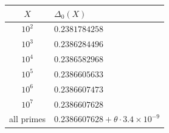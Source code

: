 \begin{tabular}{@{}cl@{}}
\toprule
$X$ & $\Delta_{0}(X)$\\
\midrule
$10^{2}$ & $0.2381784258$\\
$10^{3}$ & $0.2386284496$\\
$10^{4}$ & $0.2386582968$\\
$10^{5}$ & $0.2386605633$\\
$10^{6}$ & $0.2386607473$\\
$10^{7}$ & $0.2386607628$\\
all primes & $0.2386607628+\theta\cdot3.4\times10^{-9}$\\
\bottomrule
\end{tabular}

